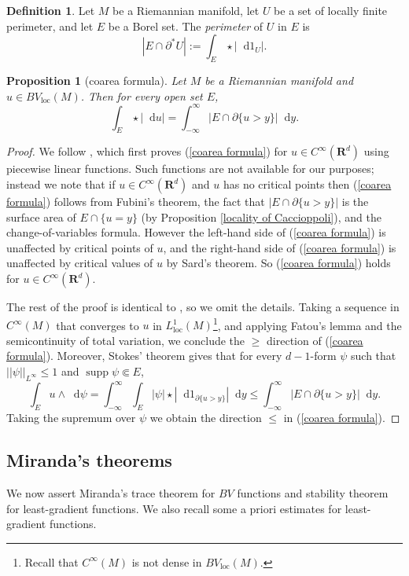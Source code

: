 \documentclass[reqno,12pt,letterpaper]{amsart}
\newcommand{\RR}{\mathbf{R}}
\DeclareMathOperator{\supp}{supp}
\newcommand*\dif{\mathop{}\!\mathrm{d}}
\newcommand{\dfn}[1]{\emph{#1}\index{#1}}
\newcommand{\loc}{\mathrm{loc}}
\newtheorem{proposition}[theorem]{Proposition}
\theoremstyle{definition}
\newtheorem{definition}[theorem]{Definition}
\numberwithin{equation}{section}
\begin{document}
\begin{definition}
Let $M$ be a Riemannian manifold, let $U$ be a set of locally finite perimeter, and let $E$ be a Borel set.
The \dfn{perimeter} of $U$ in $E$ is
$$|E \cap \partial^* U| := \int_E \star |\dif 1_U|.$$
\end{definition}

\begin{proposition}[coarea formula]\label{Coarea2}
Let $M$ be a Riemannian manifold and $u \in BV_\loc(M)$. Then for every open set $E$,
\begin{equation}\label{coarea formula}
\int_E \star |\dif u| = \int_{-\infty}^\infty |E \cap \partial \{u > y\}| \dif y.
\end{equation}
\end{proposition}
\begin{proof}
We follow \cite[Theorem 1.23]{Giusti77}, which first proves (\ref{coarea formula}) for $u \in C^\infty(\RR^d)$ using piecewise linear functions.
Such functions are not available for our purposes; instead we note that if $u \in C^\infty(\RR^d)$ and $u$ has no critical points then (\ref{coarea formula}) follows from Fubini's theorem, the fact that $|E \cap \partial \{u > y\}|$ is the surface area of $E \cap \{u = y\}$ (by Proposition \ref{locality of Caccioppoli}), and the change-of-variables formula.
However the left-hand side of (\ref{coarea formula}) is unaffected by critical points of $u$, and the right-hand side of (\ref{coarea formula}) is unaffected by critical values of $u$ by Sard's theorem.
So (\ref{coarea formula}) holds for $u \in C^\infty(\RR^d)$.

The rest of the proof is identical to \cite[Theorem 1.23]{Giusti77}, so we omit the details.
Taking a sequence in $C^\infty(M)$ that converges to $u$ in $L^1_\loc(M)$\footnote{Recall that $C^\infty(M)$ is not dense in $BV_\loc(M)$.}, and applying Fatou's lemma and the semicontinuity of total variation, we conclude the $\geq$ direction of (\ref{coarea formula}).
Moreover, Stokes' theorem gives that for every $d-1$-form $\psi$ such that $||\psi||_{L^\infty} \leq 1$ and $\supp \psi \Subset E$,
$$\int_E u \wedge \dif \psi = \int_{-\infty}^\infty \int_E |\psi| \star |\dif 1_{\partial \{u > y\}}| \dif y \leq \int_{-\infty}^\infty |E \cap \partial \{u > y\}| \dif y.$$
Taking the supremum over $\psi$ we obtain the direction $\leq$ in (\ref{coarea formula}).
\end{proof}


\subsection{Miranda's theorems}
We now assert Miranda's trace theorem for $BV$ functions and stability theorem for least-gradient functions.
We also recall some a priori estimates for least-gradient functions.
\end{document}
